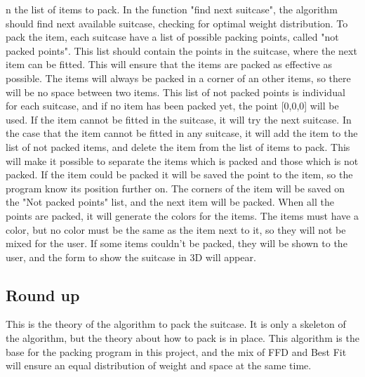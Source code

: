                                                                                                                                                                                                                                                                                                                                                                                                                                                                                                                                                                                                                                                                                                                                                                                                                                                                                                                                                                                                                                                                                                                                                                     n the list of items to pack. In the function "find next suitcase", the algorithm should find next available suitcase, checking for optimal weight distribution. To pack the item, each suitcase have a list of possible packing points, called "not packed points". This list should contain the points in the suitcase, where the next item can be fitted. This will ensure that the items are packed as effective as possible. The items will always be packed in a corner of an other items, so there will be no space between two items. This list of not packed points is individual for each suitcase, and if no item has been packed yet, the point [0,0,0] will be used. If the item cannot be fitted in the suitcase, it will try the next suitcase. In the case that the item cannot be fitted in any suitcase, it will add the item to the list of not packed items, and delete the item from the list of items to pack. This will make it possible to separate the items which is packed and those which is not packed. If the item could be packed it will be saved the point to the item, so the program know its position further on. The corners of the item will be saved on the "Not packed points" list, and the next item will be packed.
When all the points are packed, it will generate the colors for the items. The items must have a color, but no color must be the same as the item next to it, so they will not be mixed for the user. If some items couldn't be packed, they will be shown to the user, and the form to show the suitcase in 3D will appear.

\subsection{Round up}
This is the theory of the algorithm to pack the suitcase. It is only a skeleton of the algorithm, but the theory about how to pack is in place. This algorithm is the base for the packing program in this project, and the mix of FFD and Best Fit will ensure an equal distribution of weight and space at the same time. 